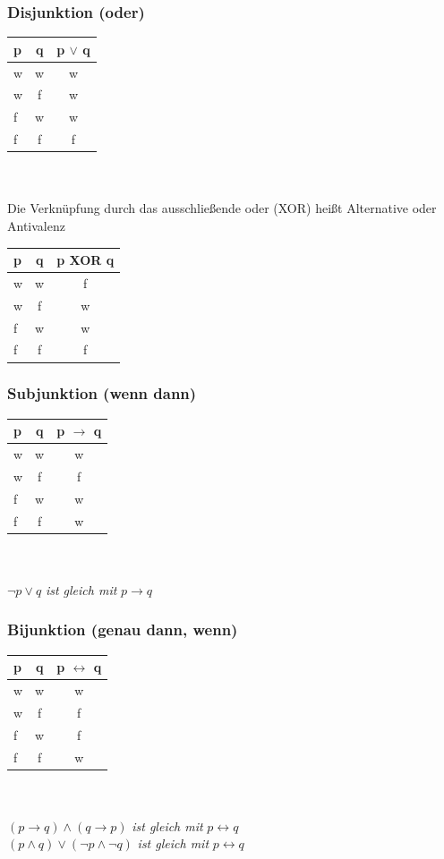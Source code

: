 \documentclass[a4paper,12pt]{scrartcl}
\begin{document}
\subsubsection{Disjunktion (oder)}
\begin{tabular}{lc|c}
  p & q & p $\vee$ q\\
  \hline
  w & w & w \\
  w & f & w \\
  f & w & w \\
  f & f & f \\
\end{tabular}
\\ 
\\ Die Verknüpfung durch das ausschließende oder (XOR) heißt Alternative oder Antivalenz \\

\begin{tabular}{lc|c}
  p & q & p XOR q\\
  \hline
  w & w & f \\
  w & f & w \\
  f & w & w \\
  f & f & f \\
\end{tabular}

\subsubsection{Subjunktion (wenn dann)}
\begin{tabular}{lc|c}
  p & q & p $\to$ q\\
  \hline
  w & w & w \\
  w & f & f \\
  f & w & w \\
  f & f & w \\
\end{tabular}
\\
\\ $\neg p \vee q$ \textit{ist gleich mit} $p \to q$

\subsubsection{Bijunktion (genau dann, wenn)}
\begin{tabular}{lc|c}
  p & q & p $\leftrightarrow$ q\\
  \hline
  w & w & w \\
  w & f & f \\
  f & w & f \\
  f & f & w \\
\end{tabular}
\\
\\ $(p \to q) \land (q \to p)$ \textit{ist gleich mit} $p \leftrightarrow q$
\\ $(p \land q) \vee (\neg p \land \neg q)$ \textit{ist gleich mit} $p \leftrightarrow q$
\end{document}
